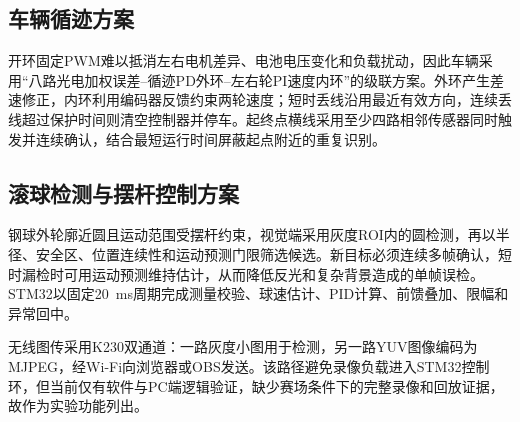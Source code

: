 \subsection{车辆循迹方案}

开环固定PWM难以抵消左右电机差异、电池电压变化和负载扰动，因此车辆采用“八路光电加权误差--循迹PD外环--左右轮PI速度内环”的级联方案。外环产生差速修正，内环利用编码器反馈约束两轮速度；短时丢线沿用最近有效方向，连续丢线超过保护时间则清空控制器并停车。起终点横线采用至少四路相邻传感器同时触发并连续确认，结合最短运行时间屏蔽起点附近的重复识别。

\subsection{滚球检测与摆杆控制方案}

钢球外轮廓近圆且运动范围受摆杆约束，视觉端采用灰度ROI内的圆检测，再以半径、安全区、位置连续性和运动预测门限筛选候选。新目标必须连续多帧确认，短时漏检时可用运动预测维持估计，从而降低反光和复杂背景造成的单帧误检。STM32以固定\SI{20}{ms}周期完成测量校验、球速估计、PID计算、前馈叠加、限幅和异常回中。

无线图传采用K230双通道：一路灰度小图用于检测，另一路YUV图像编码为MJPEG，经Wi-Fi向浏览器或OBS发送。该路径避免录像负载进入STM32控制环，但当前仅有软件与PC端逻辑验证，缺少赛场条件下的完整录像和回放证据，故作为实验功能列出。
